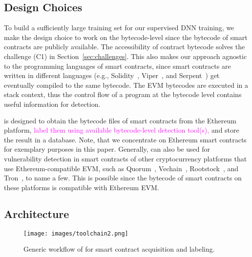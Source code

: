 \subsection{Design Choices}
\label{sec:dataset:choices}
\vspace{-0.2em}
To build a sufficiently large training set for our supervised DNN training, we make the design choice to work on the bytecode-level since the bytecode of smart contracts are publicly available. The accessibility of contract bytecode solves the challenge (C1) in Section~\ref{sec:challenges}.
This also makes our approach agnostic to the programming languages of smart contracts, since smart contracts are written in different languages (e.g., Solidity~\cite{solidity}, Viper~\cite{vyper}, and Serpent~\cite{serpent}) get eventually compiled to the same bytecode.  
The EVM bytecodes are executed in a stack context, thus the control flow of a program at the bytecode level contains useful information for detection. 

\datatool{} is designed to obtain the bytecode files of smart contracts from the Ethereum platform, \textcolor{magenta}{label them using available bytecode-level detection tool(s), }
and store the result in a database.
Note, that we concentrate on Ethereum smart contracts for exemplary purposes in this paper. Generally, \sys{} can also be used for vulnerability detection in smart contracts of other cryptocurrency platforms that use Ethereum-compatible EVM, such as Quorum~\cite{quorum}, Vechain~\cite{vechain}, Rootstock~\cite{rootstock}, and Tron~\cite{tron}, to name a few. This is possible since the bytecode of smart contracts on these platforms is compatible with Ethereum EVM. 

\subsection{\datatool{} Architecture}
\label{sec:implementation:bytecode}

\vspace{-0.5em}
\begin{figure}[ht!]
  \centering
  \texttt{[image: images/toolchain2.png]}
  \vspace{-2em}
  \caption{Generic workflow of \datatool{} for smart contract acquisition and labeling.}
  \label{fig:data:toolchain}
  \vspace{0.3em}
\end{figure}

